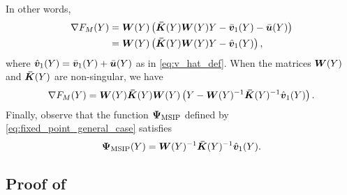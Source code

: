 In other words,
\begin{align}
    \nabla F_{M}(Y) &= \bm{W}(Y) \left( \bm{\bar{K}}(Y) \bm{W}(Y) Y  - \bar{\bm{v}}_{1}(Y) - \bar{\bm{u}}(Y)\right)\nonumber\\
    &= \bm{W}(Y) \left( \bm{\bar{K}}(Y) \bm{W}(Y) Y  - \hat{\bm{v}}_{1}(Y)\right),
\end{align}%
where $\hat{\bm{v}}_{1}(Y) = \bar{\bm{v}}_{1}(Y) + \bar{\bm{u}}(Y)$ as in \eqref{eq:v_hat_def}. When the matrices $\bm{W}(Y)$ and $\bm{\bar{K}}(Y)$ are non-singular, we have
\begin{equation}
    \nabla F_{M}(Y) = \bm{W}(Y) \bm{\bar{K}}(Y) \bm{W}(Y)\left( Y - \bm{W}(Y)^{-1} \bm{\bar{K}}(Y)^{-1} \hat{\bm{v}}_{1}(Y) \right).
\end{equation}
Finally, observe that the function $\bm{\Psi}_{\mathrm{MSIP}}$ defined by \eqref{eq:fixed_point_general_case} satisfies
\begin{equation}
\bm{\Psi}_{\mathrm{MSIP}}(Y) = \bm{W}(Y)^{-1} \bm{\bar{K}}(Y)^{-1} \hat{\bm{v}}_{1}(Y).
\end{equation}



\subsection{Proof of \texorpdfstring{}{Theorem \ref{cor:ms_as_MSIP}}}\label{proof:mean_shift_as_mmd_min}

